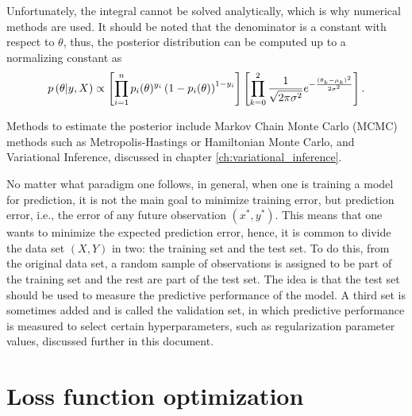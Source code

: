 Unfortunately, the integral cannot be solved analytically, which is why numerical methods are used.
It should be noted that the denominator is a constant with respect to $\theta$, thus, the posterior distribution can be computed up to a normalizing constant as
\begin{equation}
  p\left( \theta | y, X \right) \propto
  \left[ \prod_{i = 1}^n  p_i(\theta)^{y_i}\left(1 - p_i(\theta) \right)^{1 - y_i} \right]
  \left[ \prod_{k = 0}^2 \frac{1}{\sqrt{2 \pi \sigma^2}} e^{- \frac{(\theta_k - \mu_k)^2}{2\sigma^2}} \right].
\end{equation}

Methods to estimate the posterior include Markov Chain Monte Carlo (MCMC) methods such as Metropolis-Hastings or Hamiltonian Monte Carlo, and Variational Inference, discussed in chapter \ref{ch:variational_inference}.

No matter what paradigm one follows, in general, when one is training a model for prediction, it is not the main goal to minimize training error, but prediction error, i.e., the error of any future observation $(x^*, y^*)$. This means that one wants to minimize the expected prediction error, hence, it is common to divide the data set $(X, Y)$ in two: the training set and the test set. To do this, from the original data set, a random sample of observations is assigned to be part of the training set and the rest are part of the test set. The idea is that the test set should be used to measure the predictive performance of the model. A third set is sometimes added and is called the validation set, in which predictive performance is measured to select certain hyperparameters, such as regularization parameter values, discussed further in this document.



\section{Loss function optimization}

